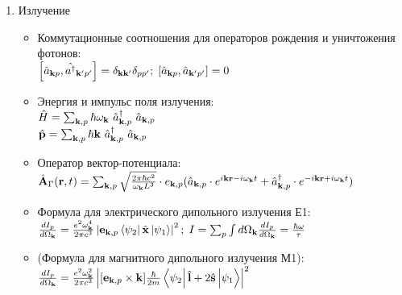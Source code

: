 \begin{enumerate}[label=\textbf{\underline{\arabic*.}}]
\begin{itemize}
        \end{itemize}
\item Излучение  \begin{itemize}
            \item Коммутационные соотношения для операторов рождения и уничтожения фотонов: \\
            $ \left[ \hat{a}_{\mathbf{k}p}, \hat{a^\dagger}_{\mathbf{k}'p'} \right] = \delta_{\mathbf{k}\mathbf{k}'}\delta_{pp'};\; \left[ \hat{a}_{\mathbf{k}p}, \hat{a}_{\mathbf{k}'p'} \right] = 0 $
            \item Энергия и импульс поля излучения: \\
            $ \hat{H} = \sum_{\v{k},p}\hbar\omega_\v{k}\ \hat{a}^\dagger_{\v{k},p}\ \hat{a}_{\v{k},p} $\\
            $ \hat{\v{p}} = \sum_{\v{k},p}\hbar\v{k}\ \hat{a}^\dagger_{\v{k},p}\ \hat{a}_{\v{k},p} $\\
            \item Оператор вектор-потенциала: \\
            $ \hat{\mathbf{A}}_\Gamma(\mathbf{r},t) = \sum_{\mathbf{k},p}\sqrt{\frac{2\pi\hbar c^2}{\omega_{\mathbf{k}}L^3}}\cdot e_{\mathbf{k},p}(\hat{a}_{\mathbf{k},p}\cdot e^{i\mathbf{k}\mathbf{r}-i\omega_{\mathbf{k}}t}+\hat{a}^\dagger_{\mathbf{k},p}\cdot e^{-i\mathbf{k}\mathbf{r}+i\omega_{\mathbf{k}}t}) $
            \item Формула для электрического дипольного излучения Е1: \\
            $ \d{I_p}{\Omega_\v{k}} = \frac{e^2 \omega_\v{k}^4}{2\pi c^3} \abs{ \v{e}_{\v{k},p}\matrixel{\psi_2}{\hat{\v{x}}}{\psi_1}}^2;\; I = \sum_p \int d\Omega_\v{k}\d{I_p}{\Omega_\v{k}} = \frac{\hbar\omega}{\tau} $
            \item (Формула для магнитного дипольного излучения М1): \\
            $ \d{I_p}{\Omega_\v{k}} = \frac{e^2 \omega_\v{k}^2}{2\pi c^3} \abs{ [\v{e}_{\v{k},p}\times\v{k}]\frac{\hbar}{2m}\matrixel{\psi_2}{\hat{\v{l}}+2\hat{\v{s}}}{\psi_1}}^2$


\end{itemize}
\end{enumerate}
